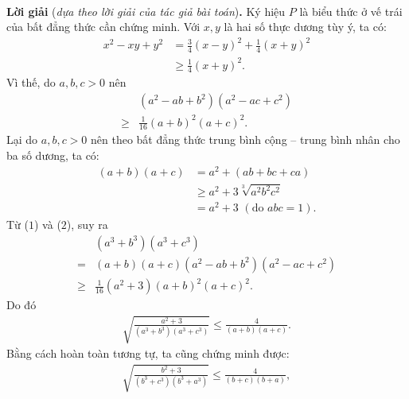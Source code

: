 \begin{multicols}{2}
\begin{align*}
	\end{align*}
	\textbf{\color{thachthuctoanhoc}Lời giải} (\textit{dựa theo lời giải của tác giả bài toán})\textbf{\color{thachthuctoanhoc}.}
	\vskip 0.05cm
	Ký hiệu $P$ là biểu thức ở vế trái của bất đẳng thức cần chứng minh.
	\vskip 0.05cm
	Với $x, y$ là hai số thực dương tùy ý, ta có:
	\begin{align*}
		{x^2} - xy + {y^2} &= \frac{3}{4}{(x - y)^2} + \frac{1}{4}{(x + y)^2}\\ &\ge \frac{1}{4}{(x + y)^2}.
	\end{align*}
	Vì thế, do $a, b, c > 0$ nên
	\begin{align*}
		&\left( {{a^2} - ab + {b^2}} \right)\left( {{a^2} - ac + {c^2}} \right)\\ 
		\ge &\frac{1}{{16}}{\left( {a + b} \right)^2}{\left( {a + c} \right)^2}. \tag{$1$}
	\end{align*}
	Lại do $a, b, c > 0$ nên theo bất đẳng thức trung bình cộng -- trung bình nhân cho ba số dương, ta có:
	\begin{align*}
		\left( {a + b} \right)\left( {a + c} \right) &= {a^2} + \left( {ab + bc + ca} \right) \\
		&\ge {a^2} + 3\sqrt[3]{{{a^2}{b^2}{c^2}}} \\
		&= {a^2} + 3 \,\,({\text{do }}abc = 1).
	\end{align*}
	Từ ($1$) và ($2$), suy ra
	\begin{align*}
		&\left( {{a^3} + {b^3}} \right)\left( {{a^3} + {c^3}} \right) \\
		= &\left( {a \!+\! b} \right)\!\left( {a \!+\! c} \right)\left( {{a^2} \!-\! ab \!+\! {b^2}} \right)\!\left( {{a^2} \!-\! ac \!+\! {c^2}} \right) \\
		\ge &\frac{1}{{16}}\left( {{a^2} + 3} \right){\left( {a + b} \right)^2}{\left( {a + c} \right)^2}.
	\end{align*}
	Do đó
	\begin{align*}
		\sqrt {\!\!\frac{{{a^2} \!+\! 3}}{{\left( {{a^3} \!+\! {b^3}} \right)\!\left( {{a^3} \!+\! {c^3}} \right)}}}  \!\le\! \frac{4}{{\left( {a \!+\! b} \right)\!\left( {a \!+\! c} \right)}}. \tag{$3$}
	\end{align*}
	Bằng cách hoàn toàn tương tự, ta cũng chứng minh được:
	\begin{align*}
		\sqrt {\!\!\frac{{{b^2} \!+\! 3}}{{\left( {{b^3} \!+\! {c^3}} \right)\!\left( {{b^3} \!+\! {a^3}} \right)}}}  \!\le\! \frac{4}{{\left( {b \!+\! c} \right)\!\left( {b \!+\! a} \right)}}, \tag{$4$}\\

\end{align*}
\end{multicols}
